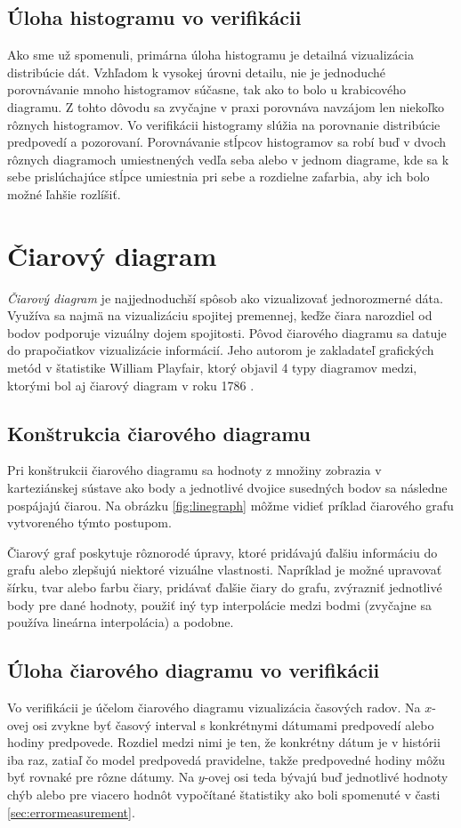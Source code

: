  
\subsection{Úloha histogramu vo verifikácii}
Ako sme už spomenuli, primárna úloha histogramu je detailná vizualizácia distribúcie dát. Vzhľadom k vysokej úrovni detailu, nie je jednoduché porovnávanie mnoho histogramov súčasne, tak ako to bolo u krabicového diagramu. Z tohto dôvodu sa zvyčajne v praxi porovnáva navzájom len niekoľko rôznych histogramov. Vo verifikácii histogramy slúžia na porovnanie distribúcie predpovedí a pozorovaní. Porovnávanie stĺpcov histogramov sa robí buď v dvoch rôznych diagramoch umiestnených vedľa seba alebo v jednom diagrame, kde sa k sebe prislúchajúce stĺpce umiestnia pri sebe a rozdielne zafarbia, aby ich bolo možné ľahšie rozlíšiť.

\section{Čiarový diagram}
\label{sec:linegraph}
\textit{Čiarový diagram} je najjednoduchší spôsob ako vizualizovať jednorozmerné dáta. Využíva sa najmä na vizualizáciu spojitej premennej, keďže čiara narozdiel od bodov podporuje vizuálny dojem spojitosti. Pôvod čiarového diagramu sa datuje do prapočiatkov vizualizácie informácií. Jeho autorom je zakladateľ grafických metód v štatistike William Playfair, ktorý objavil 4 typy diagramov medzi, ktorými bol aj čiarový diagram v roku 1786 \cite{HistoryOfInfoVis}.

\subsection{Konštrukcia čiarového diagramu}
Pri konštrukcii čiarového diagramu sa hodnoty z množiny zobrazia v karteziánskej sústave ako body a jednotlivé dvojice susedných bodov sa následne pospájajú čiarou. Na obrázku \ref{fig:linegraph} môžme vidieť príklad čiarového grafu vytvoreného týmto postupom.

Čiarový graf poskytuje rôznorodé úpravy, ktoré pridávajú ďalšiu informáciu do grafu alebo zlepšujú niektoré vizuálne vlastnosti. Napríklad je možné upravovať šírku, tvar alebo farbu čiary, pridávať ďalšie čiary do grafu, zvýrazniť jednotlivé body pre dané hodnoty, použiť iný typ interpolácie medzi bodmi (zvyčajne sa používa lineárna interpolácia) a podobne.

\subsection{Úloha čiarového diagramu vo verifikácii}
Vo verifikácii je účelom čiarového diagramu vizualizácia časových radov. Na \mbox{$ x $-ovej} osi zvykne byť časový interval s konkrétnymi dátumami predpovedí alebo hodiny predpovede. Rozdiel medzi nimi je ten, že konkrétny dátum je v histórii iba raz, zatiaľ čo model predpovedá pravidelne, takže predpovedné hodiny môžu byť rovnaké pre rôzne dátumy. Na \mbox{$ y $-ovej} osi teda bývajú buď jednotlivé hodnoty chýb alebo pre viacero hodnôt vypočítané štatistiky ako boli spomenuté v časti \ref{sec:errormeasurement}.
 

